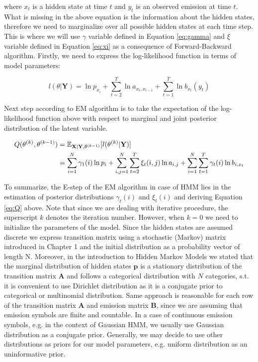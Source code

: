 where $x_t$ is a hidden state at time $t$ and $y_t$ is an observed emission at time $t$. What is missing in the above equation is the information about the
hidden states, therefore we need to marginalize over all possible hidden states at each time step.
This is where we will use $\gamma$ variable defined in Equation \ref{eq:gamma} and $\xi$ variable defined in Equation \ref{eq:xi} as a consequence of 
Forward-Backward algorithm. Firstly, we need to express the log-likelihood function in terms of model parameters:

\begin{equation}
l(\theta|\textbf{Y}) = \ln p_{x_i} + \sum_{t=2}^{T} \ln a_{x_t,x_{t-1}} + \sum_{t=1}^{T} \ln b_{x_t}(y_t)
\end{equation}

Next step according to EM algorithm is to take the expectation of the log-likelihood function above with respect to marginal and joint 
posterior distribution of the latent variable.

\begin{align} \label{eq:Q}
Q(\theta^{(k)}, \theta^{(k-1)}) &= \mathbb{E}_{\textbf{X}|\textbf{Y},\theta^{(k-1)}} [l(\theta^{(k)}|\textbf{Y})]  \\ \notag
                        &= \sum_{i=1}^{N} \gamma_1(i) \ln p_i + \sum_{i,j=1}^{N} \sum_{t=2}^{T} \xi_t (i,j) \ln a_{i,j}+ \sum_{i=1}^{N} \sum_{t=1}^{T} \gamma_t (i) \ln b_{i,x_t}
\end{align}

To summarize, the E-step of the EM algorithm in case of HMM lies in the estimation of posterior distributions $\gamma_t(i)$ and $\xi_t(i)$ 
and deriving Equation \ref{eq:Q} above. Note that since we are dealing with iterative procedure, the superscript $k$ denotes the iteration number.
However, when $k=0$ we need to initialize the parameters of the model. Since the hidden states are assumed discrete we express transition matrix using a stochastic (Markov) 
matrix introduced in Chapter 1 and the initial distribution as a probability vector of length N. Moreover, in the introduction to Hidden Markov Models 
we stated that the marginal distribution of hidden states $\textbf{p}$ is a stationary distribution of the transition matrix $\textbf{A}$ and follows a 
categorical distribution with $N$ categories, s.t. it is convenient to use Dirichlet distribution as it is a conjugate prior to categorical or multinomial distribution.
Same approach is reasonable for each row of the transition matrix $\textbf{A}$ and emission matrix $\textbf{B}$, since we are assuming that emission symbols are finite and countable. 
In a case of continuous emission symbols, e.g. in the context of Gaussian HMM, we usually use Gaussian distribution as a conjugate prior. Generally, we may decide to use other distributions as priors for our model parameters, 
e.g. uniform distribution as an uninformative prior. 

